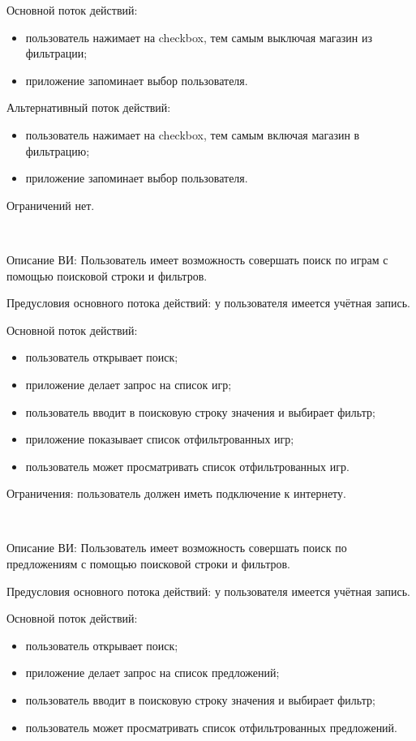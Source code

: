 Основной поток действий:
\begin{itemize}
   \item пользователь нажимает на checkbox, тем самым выключая магазин из фильтрации;
   \item приложение запоминает выбор пользователя.
\end{itemize}

Альтернативный поток действий:
\begin{itemize}
   \item пользователь нажимает на checkbox, тем самым включая магазин в фильтрацию;
   \item приложение запоминает выбор пользователя.
\end{itemize}
 
Ограничений нет.

~\par
\label{use:searchgames}
Описание ВИ: Пользователь имеет возможность совершать поиск по играм с помощью поисковой строки и фильтров.
 
Предусловия основного потока действий: у пользователя имеется учётная запись.
 
Основной поток действий:
\begin{itemize}
   \item пользователь открывает поиск;
   \item приложение делает запрос на список игр;
   \item пользователь вводит в поисковую строку значения и выбирает фильтр;
   \item приложение показывает список отфильтрованных игр;
   \item пользователь может просматривать список отфильтрованных игр.
\end{itemize}
 
Ограничения: пользователь должен иметь подключение к интернету.

~\par
\label{use:searchdeals}
Описание ВИ: Пользователь имеет возможность совершать поиск по предложениям с помощью поисковой строки и фильтров.
 
Предусловия основного потока действий: у пользователя имеется учётная запись.
 
Основной поток действий:
\begin{itemize}
   \item пользователь открывает поиск;
   \item приложение делает запрос на список предложений;
   \item пользователь вводит в поисковую строку значения и выбирает фильтр;
   \item пользователь может просматривать список отфильтрованных предложений.
\end{itemize}
 
